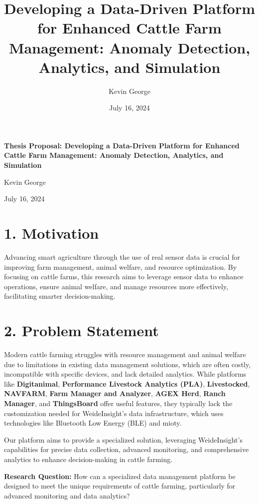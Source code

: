 \documentclass[11pt]{article}
\title{Developing a Data-Driven Platform for Enhanced Cattle Farm Management: Anomaly Detection, Analytics, and Simulation}
\author{Kevin George}
\date{July 16, 2024}
\begin{document}
\begin{titlepage}
    \centering
    \vspace*{0.3in}
    \LARGE\textbf{Thesis Proposal: Developing a Data-Driven Platform for Enhanced Cattle Farm Management: Anomaly Detection, Analytics, and Simulation}\par
    \vspace{0.5in}
    \large Kevin George\par
    \vspace{0.2in}
    \normalsize July 16, 2024
    \thispagestyle{empty}
\end{titlepage}

\section*{1. Motivation}
Advancing smart agriculture through the use of real sensor data is crucial for improving farm management, animal welfare, and resource optimization. By focusing on cattle farms, this research aims to leverage sensor data to enhance operations, ensure animal welfare, and manage resources more effectively, facilitating smarter decision-making.


\section*{2. Problem Statement}

Modern cattle farming struggles with resource management and animal welfare due to limitations in existing data management solutions, which are often costly, incompatible with specific devices, and lack detailed analytics. While platforms like \textbf{Digitanimal}, \textbf{Performance Livestock Analytics (PLA)}, \textbf{Livestocked}, \textbf{NAVFARM}, \textbf{Farm Manager and Analyzer}, \textbf{AGEX Herd}, \textbf{Ranch Manager}, and \textbf{ThingsBoard} offer useful features, they typically lack the customization needed for WeideInsight's data infrastructure, which uses technologies like Bluetooth Low Energy (BLE) and mioty.

Our platform aims to provide a specialized solution, leveraging WeideInsight's capabilities for precise data collection, advanced monitoring, and comprehensive analytics to enhance decision-making in cattle farming.

\textbf{Research Question:} How can a specialized data management platform be designed to meet the unique requirements of cattle farming, particularly for advanced monitoring and data analytics?
\end{document}
